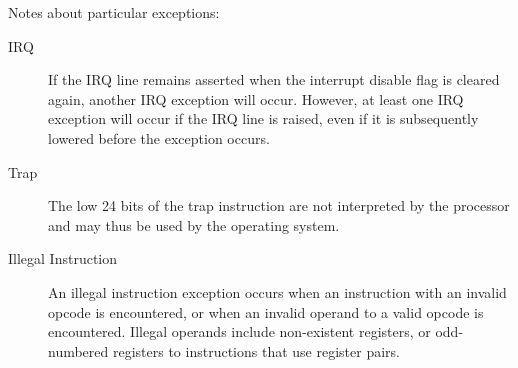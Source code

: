 Notes about particular exceptions:

\begin{description}

\item[IRQ] If the IRQ line remains asserted when the interrupt disable
	flag is cleared again, another IRQ exception will occur. 
	However, at least one IRQ exception will occur if the IRQ line
	is raised, even if it is subsequently lowered before the
	exception occurs.

\item[Trap] The low 24 bits of the trap instruction are not
	interpreted by the processor and may thus be used by the
	operating system.

\item[Illegal Instruction]

	An illegal instruction exception occurs when an instruction
	with an invalid opcode is encountered, or when an invalid
	operand to a valid opcode is encountered.  Illegal operands
	include non-existent registers, or odd-numbered registers
	to instructions that use register pairs.

\end{description}

